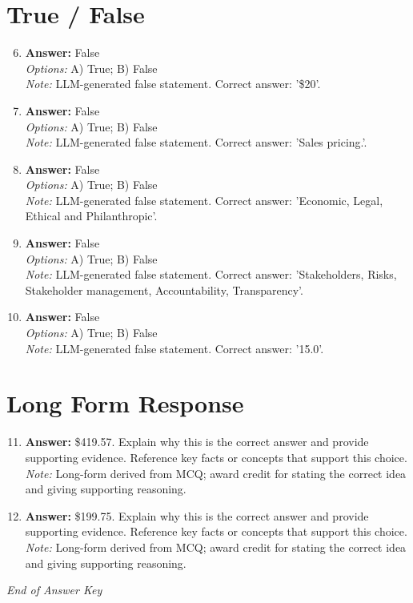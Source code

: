 \documentclass[12pt]{article}
\begin{document}
\section*{True / False}
\begin{enumerate}[label=\arabic*.]
\setcounter{enumi}{5}
\item \textbf{Answer:} False
\\ \textit{Options:} A) True; B) False
\\ \textit{Note:} LLM-generated false statement. Correct answer: '\$20'.
\item \textbf{Answer:} False
\\ \textit{Options:} A) True; B) False
\\ \textit{Note:} LLM-generated false statement. Correct answer: 'Sales pricing.'.
\item \textbf{Answer:} False
\\ \textit{Options:} A) True; B) False
\\ \textit{Note:} LLM-generated false statement. Correct answer: 'Economic, Legal, Ethical and Philanthropic'.
\item \textbf{Answer:} False
\\ \textit{Options:} A) True; B) False
\\ \textit{Note:} LLM-generated false statement. Correct answer: 'Stakeholders, Risks, Stakeholder management, Accountability, Transparency'.
\item \textbf{Answer:} False
\\ \textit{Options:} A) True; B) False
\\ \textit{Note:} LLM-generated false statement. Correct answer: '15.0'.
\end{enumerate}

\section*{Long Form Response}
\begin{enumerate}[label=\arabic*.]
\setcounter{enumi}{10}
\item \textbf{Answer:} \$419.57. Explain why this is the correct answer and provide supporting evidence. Reference key facts or concepts that support this choice.
\\ \textit{Note:} Long-form derived from MCQ; award credit for stating the correct idea and giving supporting reasoning.
\item \textbf{Answer:} \$199.75. Explain why this is the correct answer and provide supporting evidence. Reference key facts or concepts that support this choice.
\\ \textit{Note:} Long-form derived from MCQ; award credit for stating the correct idea and giving supporting reasoning.
\end{enumerate}

\vfill
\noindent\textit{End of Answer Key}
\end{document}
